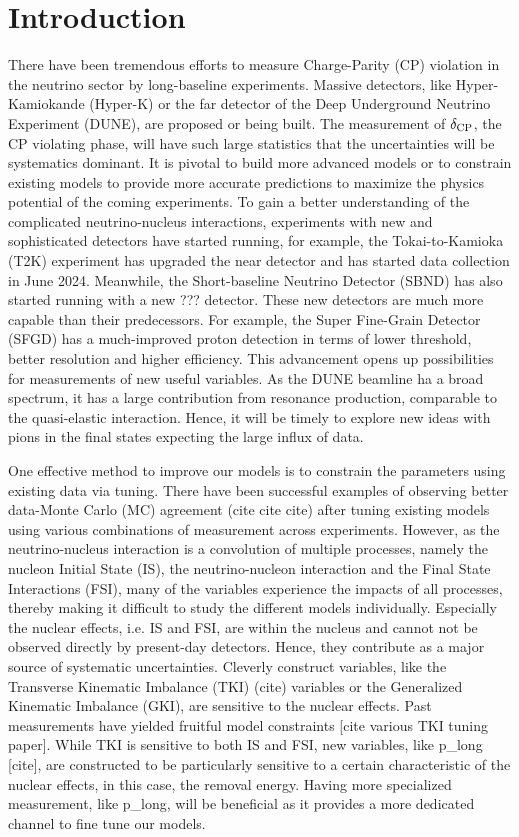 \section{Introduction}
There have been tremendous efforts to measure Charge-Parity (CP) violation in the neutrino sector by long-baseline experiments. 
Massive detectors, like Hyper-Kamiokande (Hyper-K) or the far detector of the Deep Underground Neutrino Experiment (DUNE), are proposed or being built. 
The measurement of $\delta_\textrm{CP}$, the CP violating phase, will have such large statistics that the uncertainties will be systematics dominant. 
It is pivotal to build more advanced models or to constrain existing models to provide more accurate predictions to maximize the physics potential of the coming experiments.
To gain a better understanding of the complicated neutrino-nucleus interactions, experiments with new and sophisticated detectors have started running, for example, the Tokai-to-Kamioka (T2K) experiment has upgraded the near detector and has started data collection in June 2024. 
Meanwhile, the Short-baseline Neutrino Detector (SBND) has also started running with a new ??? detector. 
These new detectors are much more capable than their predecessors. 
For example, the Super Fine-Grain Detector (SFGD) has a much-improved proton detection in terms of lower threshold, better resolution and higher efficiency. 
This advancement opens up possibilities for measurements of new useful variables. 
As the DUNE beamline ha a broad spectrum, it has a large contribution from resonance production, comparable to the quasi-elastic interaction.
Hence, it will be timely to explore new ideas with pions in the final states expecting the large influx of data. 

One effective method to improve our models is to constrain the parameters using existing data via tuning. 
There have been successful examples of observing better data-Monte Carlo (MC) agreement (cite cite cite) after tuning existing models using various combinations of measurement across experiments. 
However, as the neutrino-nucleus interaction is a convolution of multiple processes, namely the nucleon Initial State (IS), the neutrino-nucleon interaction and the Final State Interactions (FSI), many of the variables experience the impacts of all processes, thereby making it difficult to study the different models individually. 
Especially the nuclear effects, i.e. IS and FSI, are within the nucleus and cannot not be observed directly by present-day detectors. 
Hence, they contribute as a major source of systematic uncertainties. Cleverly construct variables, like the Transverse Kinematic Imbalance (TKI) (cite) variables or the Generalized Kinematic Imbalance (GKI), are sensitive to the nuclear effects. Past measurements have yielded fruitful model constraints [cite various TKI tuning paper]. 
While TKI is sensitive to both IS and FSI, new variables, like p_long [cite], are constructed to be particularly sensitive to a certain characteristic of the nuclear effects, in this case, the removal energy. 
Having more specialized measurement, like p_long, will be beneficial as it provides a more dedicated channel to fine tune our models. 

